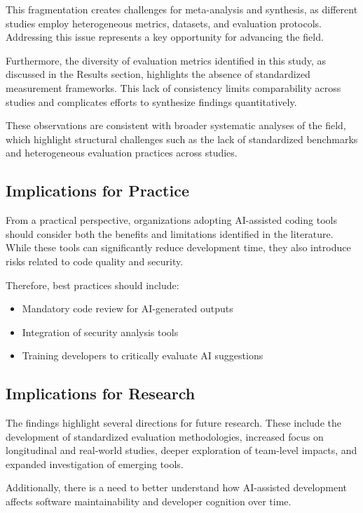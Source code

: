 \documentclass[conference]{IEEEtran}
\begin{document}
This fragmentation creates challenges for meta-analysis and synthesis, as different studies employ heterogeneous metrics, datasets, and evaluation protocols. Addressing this issue represents a key opportunity for advancing the field.

Furthermore, the diversity of evaluation metrics identified in this study, as discussed in the Results section, highlights the absence of standardized measurement frameworks. This lack of consistency limits comparability across studies and complicates efforts to synthesize findings quantitatively.

These observations are consistent with broader systematic analyses of the field, which highlight structural challenges such as the lack of standardized benchmarks and heterogeneous evaluation practices across studies.

\subsection{Implications for Practice}

From a practical perspective, organizations adopting AI-assisted coding tools should consider both the benefits and limitations identified in the literature. While these tools can significantly reduce development time, they also introduce risks related to code quality and security.

Therefore, best practices should include:
\begin{itemize}
    \item Mandatory code review for AI-generated outputs
    \item Integration of security analysis tools
    \item Training developers to critically evaluate AI suggestions
\end{itemize}

\subsection{Implications for Research}

The findings highlight several directions for future research. These include the development of standardized evaluation methodologies, increased focus on longitudinal and real-world studies, deeper exploration of team-level impacts, and expanded investigation of emerging tools.

Additionally, there is a need to better understand how AI-assisted development affects software maintainability and developer cognition over time.
\end{document}
